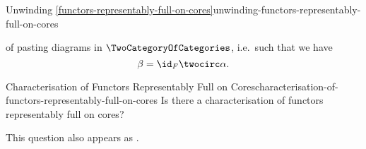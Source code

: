 \begin{remark}{Unwinding \cref{functors-representably-full-on-cores}}{unwinding-functors-representably-full-on-cores}
\begin{webcompile}
        \bigequalssign
        \quad
    \end{webcompile}
    of pasting diagrams in $\TwoCategoryOfCategories$, i.e.\ such that we have
    \[
        \beta%
        =%
        \id_{F}\twocirc\alpha.%
    \]%
\end{remark}
\begin{question}{Characterisation of Functors Representably Full on Cores}{characterisation-of-functors-representably-full-on-cores}%
    Is there a characterisation of functors representably full on cores?

    This question also appears as \cite{MO468125}.
\end{question}
